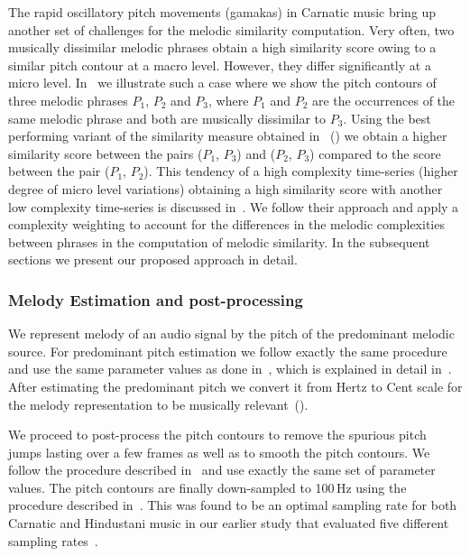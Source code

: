 The rapid oscillatory pitch movements (\glspl{gamaka}) in Carnatic music bring up another set of challenges for the melodic similarity computation. Very often, two musically dissimilar melodic phrases obtain a high similarity score owing to a similar pitch contour at a macro level. However, they differ significantly at a micro level. In~ we illustrate such a case where we show the pitch contours of three melodic phrases $P_1$, $P_2$ and $P_3$, where $P_1$ and $P_2$ are the occurrences of the same melodic phrase and both are musically dissimilar to $P_3$. Using the best performing variant of the similarity measure obtained in~ () we obtain a higher similarity score between the pairs ($P_1$, $P_3$) and ($P_2$, $P_3$) compared to the score between the pair ($P_1$, $P_2$). This tendency of a high complexity time-series (higher degree of micro level variations) obtaining a high similarity score with another low complexity time-series is discussed in~\cite{batista2011complexity}. We follow their approach and apply a complexity weighting to account for the differences in the melodic complexities between phrases in the computation of melodic similarity. In the subsequent sections we present our proposed approach in detail. 


\subsubsection{Melody Estimation and post-processing}
\label{sec:patterns_improving_similarity_melody_estimation}

We represent melody of an audio signal by the pitch of the predominant melodic source. For predominant pitch estimation we follow exactly the same procedure and use the same parameter values as done in~, which is explained in detail in~. After estimating the predominant pitch we convert it from Hertz to Cent scale for the melody representation to be musically relevant~().

We proceed to post-process the pitch contours to remove the spurious pitch jumps lasting over a few frames as well as to smooth the pitch contours. We follow the procedure described in~ and use exactly the same set of parameter values. The pitch contours are finally down-sampled to 100\,Hz using the procedure described in~. This was found to be an optimal sampling rate for both Carnatic and Hindustani music in our earlier study that evaluated five different sampling rates~. 


